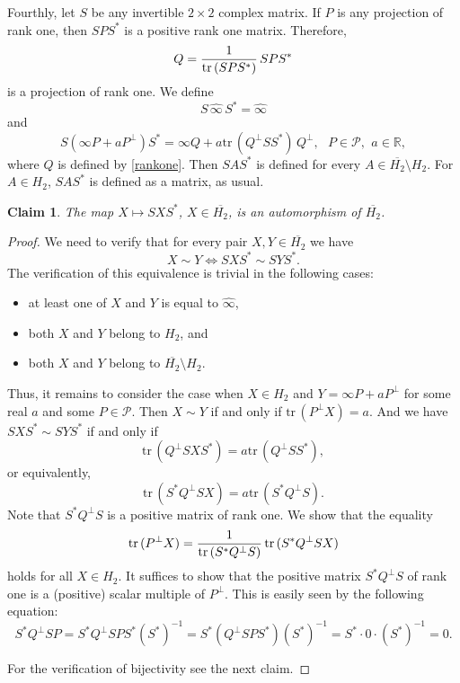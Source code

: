 \documentclass[10pt]{amsart}
\newtheorem{claim}[theorem]{Claim}
\theoremstyle{definition}
\theoremstyle{remark}
\numberwithin{subsection}{section}
\numberwithin{equation}{section}
\newcommand\oH{{\overline{H_2}}}
\newcommand\oi{{\widehat{\infty}}}
\begin{document}
Fourthly, let $S$ be any invertible $2 \times 2$ complex matrix. If $P$ is any projection of rank one, then $SPS^\ast$ is a positive rank one matrix.
Therefore,
\begin{equation}\label{rankone}
Q= {1 \over \mathrm{tr}\, (SPS^\ast)  } \, SPS^\ast 
\end{equation}
is a projection of rank one. We define
\[
S\,  {\oi}\,  S^\ast = {\oi}
\]
and
\[
S ( \infty P + aP^{\perp})S^\ast =  \infty Q +   a \mathrm{tr}\, (Q^\perp SS^\ast) \, Q^{\perp}  , \ \ \ P\in \mathcal{P}, \ \, a \in \mathbb{R},
\]
where $Q$ is defined by \eqref{rankone}.  
Then $SAS^*$  is defined for every $A\in \oH\setminus H_2$.
For $A\in H_2$, $SAS^*$ is defined as a matrix, as usual.
\begin{claim}\label{sas*}
The map $X \mapsto SXS^\ast $, $X \in \oH$, is an automorphism of $\oH$. 
\end{claim}
\begin{proof}
We need to verify that for every pair $X,Y \in \oH$ we have
\begin{equation}\label{sxs}
X \sim Y \iff SXS^\ast \sim SYS^\ast.
\end{equation}
The verification of this equivalence is trivial in the following cases:
\begin{itemize}
\item at least one of $X$ and $Y$ is equal to ${\oi}$,
\item both $X$ and $Y$ belong to $H_2$, and
\item both $X$ and $Y$ belong to $\oH\setminus H_2$.
\end{itemize}
Thus, it remains to consider the case when 
$X \in H_2$ and $Y =  \infty P + aP^{\perp}$ for some real $a$ and some $P \in \mathcal{P}$. Then $X \sim Y$ if and only if $\mathrm{tr}\, (P^\perp X) = a$. And we have $SXS^\ast \sim SYS^\ast$ if and only if
\[
\mathrm{tr}\, (Q^\perp SXS^\ast) = a \mathrm{tr}\, (Q^\perp SS^\ast),
\]
or equivalently, 
\[
\mathrm{tr}\, (S^\ast Q^\perp SX) = a \mathrm{tr}\, (S^\ast Q^\perp S).
\]
Note that $S^\ast Q^\perp S$ is a positive matrix of rank one. 
We show that the equality
\[
\mathrm{tr}\, (P^\perp X)={1 \over \mathrm{tr}\, (S^\ast Q^\perp S ) } \, 
\mathrm{tr}\, (S^\ast Q^\perp SX)
\]
holds for all $X\in H_2$. 
It suffices to show that the positive matrix $S^\ast Q^\perp S$ of rank one is a (positive) scalar multiple of $P^\perp$. 
This is easily seen by the following equation: 
\[
S^\ast Q^\perp SP = S^\ast Q^\perp SP S^\ast (S^\ast)^{-1} =  S^\ast  (Q^\perp SP S^\ast) (S^\ast)^{-1} = S^\ast \cdot 0\cdot (S^\ast)^{-1} =0.
\]

For the verification of bijectivity see the next claim.
\end{proof}
\end{document}
